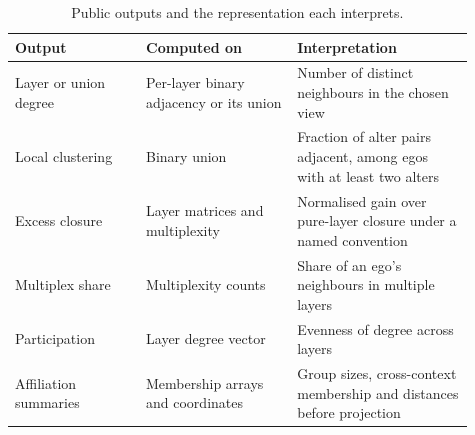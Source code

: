 \begin{table}[!htbp]
\centering\small
\caption{Public outputs and the representation each interprets.}
\label{tab:descriptors}
\begin{tabular}{@{} >{\raggedright\arraybackslash}p{0.26\linewidth} >{\raggedright\arraybackslash}p{0.3\linewidth} >{\raggedright\arraybackslash}p{0.35\linewidth} @{}}
\toprule
\rowcolor{tableblue} \textbf{Output} & \textbf{Computed on} & \textbf{Interpretation} \\
\midrule
Layer or union degree & Per-layer binary adjacency or its union & Number of distinct neighbours in the chosen view \\
Local clustering & Binary union & Fraction of alter pairs adjacent, among egos with at least two alters \\
Excess closure & Layer matrices and multiplexity & Normalised gain over pure-layer closure under a named convention \\
Multiplex share & Multiplexity counts & Share of an ego’s neighbours in multiple layers \\
Participation & Layer degree vector & Evenness of degree across layers \\
Affiliation summaries & Membership arrays and coordinates & Group sizes, cross-context membership and distances before projection \\
\bottomrule
\end{tabular}
\end{table}
